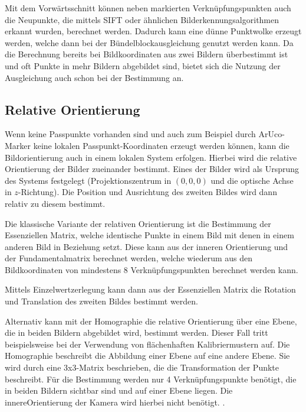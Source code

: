 \documentclass[./00PhotoBox.tex]{subfiles}
\begin{document}
Mit dem Vorwärts\-schnitt können neben markierten Verknüpfungspunkten auch die Neupunkte, die mittels SIFT oder ähnlichen Bild\-erkennungs\-algorithmen erkannt wurden, berechnet werden. Dadurch kann eine dünne Punktwolke erzeugt werden, welche dann bei der Bündelblockausgleichung genutzt werden kann. Da die Berechnung bereits bei Bildkoordinaten aus zwei Bildern überbestimmt ist und oft Punkte in mehr Bildern abgebildet sind, bietet sich die Nutzung der Ausgleichung auch schon bei der Bestimmung an. \citep[S. 385]{luhmann}

\subsection{Relative Orientierung}
\label{ss:relative_orientierung}
Wenn keine Passpunkte vorhanden sind und auch zum Beispiel durch ArUco-Marker keine lokalen Passpunkt-Koordinaten erzeugt werden können, kann die Bildorientierung auch in einem lokalen System erfolgen. Hierbei wird die relative Orientierung der Bilder zueinander bestimmt. Eines der Bilder wird als Ursprung des Systems festgelegt (Projektionszentrum in $(0,0,0)$ und die optische Achse in $z$-Richtung). Die Position und Ausrichtung des zweiten Bildes wird dann relativ zu diesem bestimmt. \citep[S. 316]{luhmann}

Die klassische Variante der relativen Orientierung ist die Bestimmung der Essenziellen Matrix, welche identische Punkte in einem Bild mit denen in einem anderen Bild in Beziehung setzt. Diese kann aus der inneren Orientierung und der Fundamentalmatrix berechnet werden, welche wiederum aus den Bildkoordinaten von mindestens 8 Verknüpfungspunkten berechnet werden kann. \citep[S. 328ff]{luhmann}

Mittels Einzelwertzerlegung kann dann aus der Essenziellen Matrix die Rotation und Translation des zweiten Bildes bestimmt werden. \citep[S. 275]{hartley}

Alternativ kann mit der Homographie die relative Orientierung über eine Ebene, die in beiden Bildern abgebildet wird, bestimmt werden. Dieser Fall tritt beispielsweise bei der Verwendung von flächenhaften Kalibriermustern auf. Die Homographie beschreibt die Abbildung einer Ebene auf eine andere Ebene. Sie wird durch eine 3x3-Matrix beschrieben, die die Transformation der Punkte beschreibt. Für die Bestimmung werden nur 4 Verknüpfungspunkte benötigt, die in beiden Bildern sichtbar sind und auf einer Ebene liegen. Die \gls{innereOrientierung} der Kamera wird hierbei nicht benötigt. \citep[S. 33ff]{hartley}.
\end{document}
